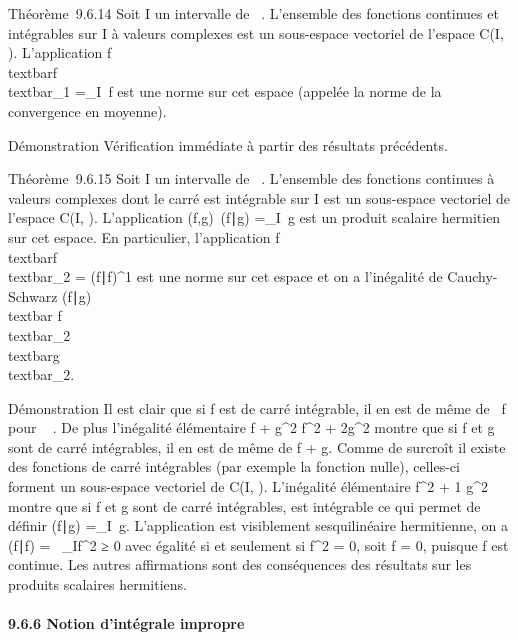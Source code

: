 \documentclass[]{article}
\begin{document}
Théorème~9.6.14 Soit I un intervalle de ~. L'ensemble des fonctions
continues et intégrables sur I à valeurs complexes est un sous-espace
vectoriel de l'espace C(I, ). L'application
f\mapsto~\\textbar{}f\\textbar{}\_1
=\int  \_I~\textbar{}f\textbar{} est une
norme sur cet espace (appelée la norme de la convergence en moyenne).

Démonstration Vérification immédiate à partir des résultats précédents.

Théorème~9.6.15 Soit I un intervalle de ~. L'ensemble des fonctions
continues à valeurs complexes dont le carré est intégrable sur I est un
sous-espace vectoriel de l'espace C(I, ). L'application
(f,g)\mapsto~(f\mathrel∣g)
=\int  \_I\overlinef~g
est un produit scalaire hermitien sur cet espace. En particulier,
l'application
f\mapsto~\\textbar{}f\\textbar{}\_2
= (f∣f)^1 est une norme sur cet
espace et on a l'inégalité de Cauchy-Schwarz
\textbar{}(f∣g)\textbar{}\leq\\textbar{}
f\\textbar{}\_2\\textbar{}g\\textbar{}\_2.

Démonstration Il est clair que si f est de carré intégrable, il en est
de même de \alpha~f pour \alpha~ \in {}. De plus l'inégalité élémentaire \textbar{}f +
g\textbar{}^2 \textbar{}f\textbar{}^2 +
2\textbar{}g\textbar{}^2 montre que si f et g sont de carré
intégrables, il en est de même de f + g. Comme de surcroît il existe des
fonctions de carré intégrables (par exemple la fonction nulle),
celles-ci forment un sous-espace vectoriel de C(I, ). L'inégalité
élémentaire \textbar{}\overlinefg\textbar{}
 \textbar{}f\textbar{}^2 + 1
 \textbar{}g\textbar{}^2 montre que
si f et g sont de carré intégrables, \overlinegf est
intégrable ce qui permet de définir (f∣g)
=\int  \_I\overlinef~g.
L'application est visiblement sesquilinéaire hermitienne, on a
(f∣f) =\int ~
\_I\textbar{}f\textbar{}^2 ≥ 0 avec égalité si et
seulement si \textbar{}f\textbar{}^2 = 0, soit f = 0, puisque
f est continue. Les autres affirmations sont des conséquences des
résultats sur les produits scalaires hermitiens.

\paragraph{9.6.6 Notion d'intégrale impropre}
\end{document}
